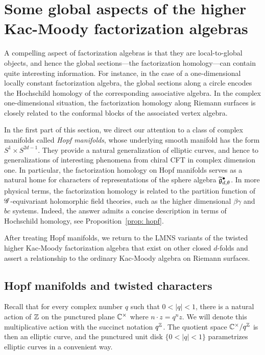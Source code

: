  \section{Some global aspects of the higher Kac-Moody factorization algebras}

A compelling aspect of factorization algebras is that they are local-to-global objects,
and hence the global sections---the factorization homology---can contain quite interesting information.
For instance, in the case of a one-dimensional locally constant factorization algebra, the global sections along a circle encodes the Hochschild homology of the corresponding associative algebra. 
In the complex one-dimensional situation, the factorization homology along Riemann surfaces is closely related to the conformal blocks of the associated vertex algebra. 

In the first part of this section, we direct our attention to a class of complex manifolds called {\em Hopf manifolds},
whose underlying smooth manifold has the form $S^1 \times S^{2d-1}$.
They provide a natural generalization of elliptic curves, and hence to generalizations of interesting phenomena from chiral CFT in complex dimension one.
In particular, the factorization homology on Hopf manifolds serves as a natural home for characters of representations of the sphere algebra $\widetilde{\mathfrak g}_{d,\theta}^\bullet$.
In more physical terms, the factorization homology is related to the partition function of $\mathscr G$-equivariant holomorphic field theories, such as the higher dimensional $\beta\gamma$ and $bc$ systems.
Indeed, the answer admits a concise description in terms of Hochschild homology, see Proposition~\ref{prop: hopf}. 

After treating Hopf manifolds, we return to the LMNS variants of the twisted higher Kac-Moody factorization algebra that exist on other closed $d$-folds and assert a relationship to the ordinary Kac-Moody algebra on Riemann surfaces. 

\subsection{Hopf manifolds and twisted characters}

Recall that for every complex number $q$ such that $0< |q| < 1$, 
there is a natural action of $\mathbb Z$ on the punctured plane $\mathbb C^\times$ where $n \cdot z = q^n z$.
We will denote this multiplicative action with the succinct notation $q^\mathbb Z$.
The quotient space $\mathbb C^\times/q^\mathbb Z$ is then an elliptic curve,
and the punctured unit disk $\{0< |q|<1\}$ parametrizes elliptic curves in a convenient way.

